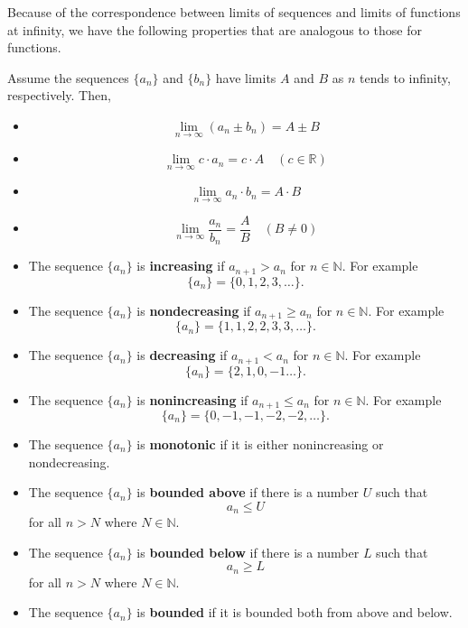 \documentclass[compacto,10pt,comentarios]{aleph-notas}
\begin{document}
Because of the correspondence between limits of sequences and limits of functions at infinity, we have the following properties that are analogous to those for functions.
\begin{teo}
    Assume the sequences $\{a_n\}$ and $\{b_n\}$ have limits $A$ and $B$ as $n$ tends to infinity, respectively. Then,
    \begin{itemize}
        \item
        $$
            \lim_{n \to \infty} \left(a_n \pm b_n \right) = A \pm B
        $$
        \item
        $$
            \lim_{n \to \infty} c \cdot a_n = c \cdot A \quad (c \in \mathbb{R})
        $$
        \item
        $$
            \lim_{n \to \infty} a_n \cdot b_n = A \cdot B
        $$
        \item
        $$
            \lim_{n \to \infty} \frac{a_n}{b_n} = \frac{A}{B} \quad (B \neq 0)
        $$
    \end{itemize}
\end{teo}

\begin{defi}
    \begin{itemize}
        \item The sequence $\{a_n\}$ is \textbf{increasing} if $a_{n+1} > a_n$ for $n \in \mathbb{N}$. For example
        $$
            \{a_n\} = \{0, 1, 2, 3, \ldots \}.
        $$
        \item The sequence $\{a_n\}$ is \textbf{nondecreasing} if $a_{n+1} \geq a_n$ for $n \in \mathbb{N}$. For example
        $$
            \{a_n\} = \{1, 1, 2, 2, 3, 3, \ldots \}.
        $$
        \item The sequence  $\{a_n\}$ is \textbf{decreasing} if $a_{n+1} < a_n$ for $n \in \mathbb{N}$. For example
        $$
            \{a_n\} = \{2, 1, 0, -1 \ldots \}.
        $$
        \item  The sequence $\{a_n\}$ is \textbf{nonincreasing} if $a_{n+1} \leq a_n$ for $n \in \mathbb{N}$. For example
        $$
            \{a_n\} = \{0, -1, -1, -2, -2,\ldots \}.
        $$
        \item The sequence $\{a_n\}$ is \textbf{monotonic} if it is either nonincreasing or nondecreasing.
        \item The sequence $\{a_n\}$ is \textbf{bounded above} if there is a number $U$ such that
        $$
            a_n \leq U
        $$
        for all $n > N$ where $N \in \mathbb{N}$.
        \item The sequence $\{a_n\}$ is \textbf{bounded below} if there is a number $L$ such that
        $$
            a_n \geq L
        $$
        for all $n > N$ where $N \in \mathbb{N}$.
        \item The sequence $\{a_n\}$ is \textbf{bounded} if it is bounded both from above and below.
    \end{itemize}
\end{defi}
\end{document}

